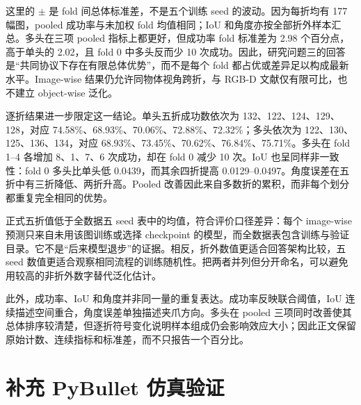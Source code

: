\documentclass{l4proj}
\begin{document}
\begin{table}[htbp]
  \centering
  \caption{Image-wise 五折结果。中心值汇总 885 个折外预测，$\pm$ 为五个等大测试折之间的总体标准差。}
  \label{tab:image-wise-cv}
\end{table}

这里的 $\pm$ 是 fold 间总体标准差，不是五个训练 seed 的波动。因为每折均有 177 幅图，pooled 成功率与未加权 fold 均值相同；IoU 和角度亦按全部折外样本汇总。多头在三项 pooled 指标上都更好，但成功率 fold 标准差为 2.98 个百分点，高于单头的 2.02，且 fold 0 中多头反而少 10 次成功。因此，研究问题三的回答是“共同协议下存在有限总体优势”，而不是每个 fold 都占优或差异足以构成最新水平。Image-wise 结果仍允许同物体视角跨折，与 RGB-D 文献仅有限可比，也不建立 object-wise 泛化。

逐折结果进一步限定这一结论。单头五折成功数依次为 132、122、124、129、128，对应 74.58\%、68.93\%、70.06\%、72.88\%、72.32\%；多头依次为 122、130、125、136、134，对应 68.93\%、73.45\%、70.62\%、76.84\%、75.71\%。多头在 fold 1--4 各增加 8、1、7、6 次成功，却在 fold 0 减少 10 次。IoU 也呈同样非一致性：fold 0 多头比单头低 0.0439，而其余四折提高 0.0129--0.0497。角度误差在五折中有三折降低、两折升高。Pooled 改善因此来自多数折的累积，而非每个划分都重复完全相同的优势。

正式五折值低于全数据五 seed 表中的均值，符合评价口径差异：每个 image-wise 预测只来自未用该图训练或选择 checkpoint 的模型，而全数据表包含训练与验证目录。它不是“后来模型退步”的证据。相反，折外数值更适合回答架构比较，五 seed 数值更适合观察相同流程的训练随机性。把两者并列但分开命名，可以避免用较高的非折外数字替代泛化估计。

此外，成功率、IoU 和角度并非同一量的重复表达。成功率反映联合阈值，IoU 连续描述空间重合，角度误差单独描述夹爪方向。多头在 pooled 三项同时改善使其总体排序较清楚，但逐折符号变化说明样本组成仍会影响效应大小；因此正文保留原始计数、连续指标和标准差，而不只报告一个百分比。

\section{补充 PyBullet 仿真验证}
\end{document}
